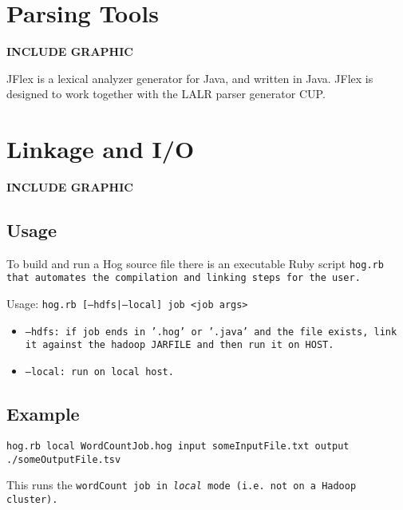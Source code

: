 \documentclass{book}
\begin{document}

\chapter{Parsing Tools} %
\label{cha:parsing_tools}

\textbf{INCLUDE GRAPHIC}

JFlex is a lexical analyzer generator for Java, and written in Java. JFlex is
designed to work together with the LALR parser generator CUP.


\chapter{Linkage and I/O} %
\label{cha:linkage_and_i_o}

\textbf{INCLUDE GRAPHIC}

\section{Usage} %
\label{sec:usage}


To build and run a Hog source file there is an executable Ruby script \tt hog.rb
\rm that automates the compilation and linking steps for the user.

Usage: \tt hog.rb [--hdfs|--local] job <job args> \rm
\begin{itemize}
  \item[] \tt --hdfs\rm: if job ends in '.hog' or '.java' and the file exists, link it against the hadoop JARFILE and then run it on HOST.
  \item[] \tt --local\rm: run on local host.
\end{itemize}

\section{Example} %
\label{sec:example}

\tt hog.rb ­­local WordCountJob.hog ­­input someInputFile.txt ­­output
./someOutputFile.tsv \rm

This runs the \tt wordCount \rm job in \emph{local} mode (i.e. not on a Hadoop
cluster).


\end{document}
